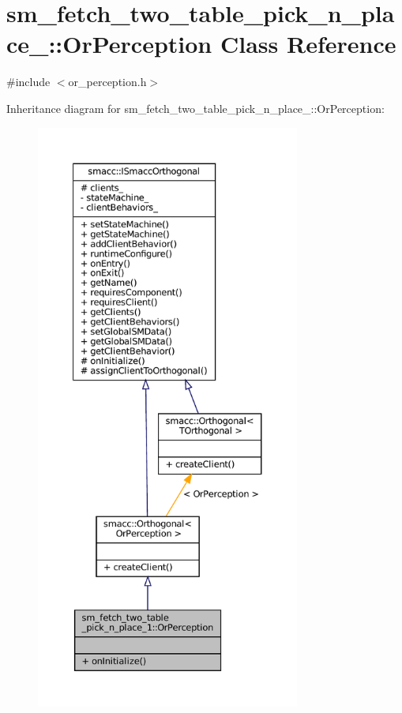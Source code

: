 \hypertarget{classsm__fetch__two__table__pick__n__place__1_1_1OrPerception}{}\section{sm\+\_\+fetch\+\_\+two\+\_\+table\+\_\+pick\+\_\+n\+\_\+place\+\_\+:\+:Or\+Perception Class Reference}
\label{classsm__fetch__two__table__pick__n__place__1_1_1OrPerception}


{\ttfamily \#include $<$or\+\_\+perception.\+h$>$}



Inheritance diagram for sm\+\_\+fetch\+\_\+two\+\_\+table\+\_\+pick\+\_\+n\+\_\+place\+\_\+:\+:Or\+Perception\+:
\nopagebreak
\begin{figure}[H]
\begin{center}
\leavevmode
\includegraphics[height=550pt]{classsm__fetch__two__table__pick__n__place__1_1_1OrPerception__inherit__graph}
\end{center}
\end{figure}


